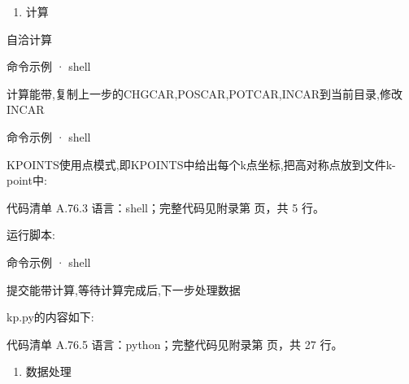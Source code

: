 \documentclass[lang=cn,scheme=chinese,color=blue,device=normal,toc=onecol,math=cm]{elegantbook}
\begin{document}
\begin{enumerate}
\item 计算
\end{enumerate}


自洽计算\par


\begin{inlinecodebox}{命令示例 · shell}
\end{inlinecodebox}


计算能带,复制上一步的CHGCAR,POSCAR,POTCAR,INCAR到当前目录,修改INCAR\par


\begin{inlinecodebox}{命令示例 · shell}
\end{inlinecodebox}


KPOINTS使用点模式,即KPOINTS中给出每个k点坐标,把高对称点放到文件k-point中:\par


\begin{codeindexbox}{代码清单 A.76.3}
语言：shell；完整代码见附录第 \pageref{code:76:3} 页，共 5 行。
\end{codeindexbox}


运行脚本:\par


\begin{inlinecodebox}{命令示例 · shell}
\end{inlinecodebox}


提交能带计算,等待计算完成后,下一步处理数据\par


kp.py的内容如下:\par


\begin{codeindexbox}{代码清单 A.76.5}
语言：python；完整代码见附录第 \pageref{code:76:5} 页，共 27 行。
\end{codeindexbox}


\begin{enumerate}
\item 数据处理
\end{enumerate}
\end{document}
